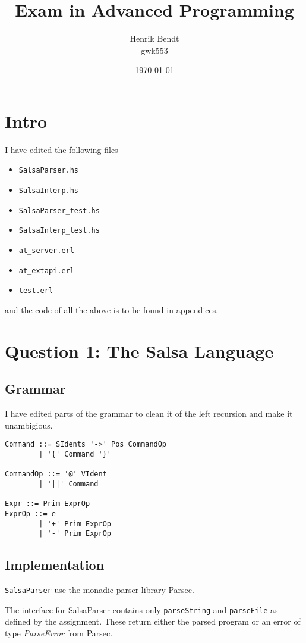 \documentclass[a4paper, 10pt]{article}
\author{Henrik Bendt\\ gwk553}
\title{Exam in Advanced Programming}
\date{\today}
\begin{document}
\maketitle
\pagebreak

\section{Intro}
I have edited the following files
\begin{itemize}
  \item \texttt{SalsaParser.hs}
  \item \texttt{SalsaInterp.hs}
  \item \texttt{SalsaParser\_test.hs}
  \item \texttt{SalsaInterp\_test.hs}
  \item \texttt{at\_server.erl}
  \item \texttt{at\_extapi.erl}
  \item \texttt{test.erl}
\end{itemize}
and the code of all the above is to be found in appendices.

\section{Question 1: The Salsa Language}
\subsection{Grammar}
I have edited parts of the grammar to clean it of the left recursion and make it unambigious.

\begin{verbatim}
Command ::= SIdents '->' Pos CommandOp
        | '{' Command '}'

CommandOp ::= '@' VIdent
        | '||' Command

Expr ::= Prim ExprOp
ExprOp ::= e
        | '+' Prim ExprOp
        | '-' Prim ExprOp

\end{verbatim}

\subsection{Implementation}
\texttt{SalsaParser} use the monadic parser library Parsec. 

The interface for SalsaParser contains only \texttt{parseString} and \texttt{parseFile} as defined by the assignment. These return either the parsed program or an error of type \textit{ParseError} from Parsec.
\end{document}
